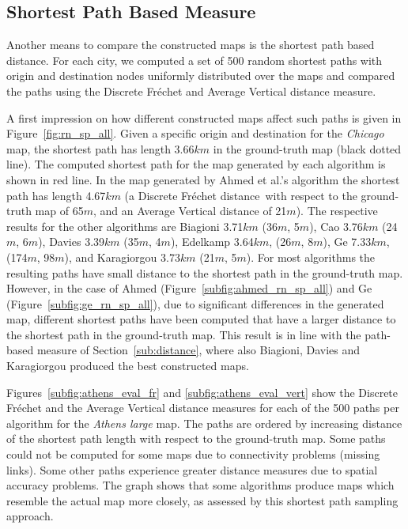 \documentclass[natbib]{svjour3}                    \smartqed  \usepackage[table]{xcolor}
\newcommand{\Frd}{Fr\'echet distance}
\begin{document}
\subsection{Shortest Path Based Measure}

Another means to compare the constructed maps is the shortest path based distance. For each city, we computed a set of 500 random shortest paths with origin and destination nodes uniformly distributed over the maps and compared the paths using the Discrete Fréchet and Average Vertical distance measure.

A first impression on how different constructed maps affect such paths is given in Figure~\ref{fig:rn_sp_all}. Given 
 a specific  origin and destination for the \emph{Chicago} map, the shortest path has length 3.66$km$ in the ground-truth map (black dotted line). 
The computed shortest path for the map generated by each algorithm is shown in red line. In the map generated by Ahmed et al.'s algorithm the shortest path has length 4.67$km$ (a Discrete \Frd\ with respect to the ground-truth map of 65$m$, and an Average Vertical distance of 21$m$). 
The respective results for the other algorithms are Biagioni 3.71$km$ (36$m$, 5$m$), Cao 3.76$km$ (24$m$, 6$m$), Davies 3.39$km$ (35$m$, 4$m$), Edelkamp 3.64$km$, (26$m$, 8$m$), Ge 7.33$km$, (174$m$, 98$m$), and Karagiorgou 3.73$km$ (21$m$, 5$m$).
For most algorithms the resulting paths have small distance to the shortest path in the ground-truth map. However, in the case of Ahmed (Figure~\ref{subfig:ahmed_rn_sp_all}) and Ge (Figure~\ref{subfig:ge_rn_sp_all}), due to significant differences in the generated map, different shortest paths have been computed that have a larger distance to the shortest path in the ground-truth map. This result is in line with the path-based measure of Section~\ref{sub:distance}, where also Biagioni, Davies and Karagiorgou produced the best constructed maps.
 
Figures~\ref{subfig:athens_eval_fr} and \ref{subfig:athens_eval_vert} show the Discrete Fréchet and the Average Vertical distance measures for each of the 500 paths per algorithm for the \emph{Athens large} map. The paths are ordered by increasing distance of the shortest path length with respect to the ground-truth map. Some paths could not be computed for some maps due to connectivity problems (missing links). Some other paths experience greater distance measures due to spatial accuracy problems. The graph shows that some algorithms produce maps which resemble the actual map more closely, as assessed by this shortest path sampling approach.
 
\end{document}
